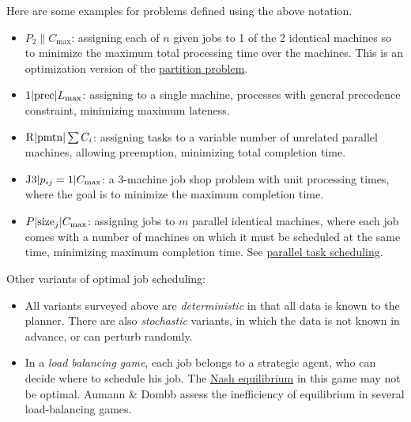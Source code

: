 \documentclass{article}
\begin{document}
Here are some examples for problems defined using the above notation.
\begin{itemize}
	\item $P_2\parallel C_{\max}$: assigning each of $n$ given jobs to 1 of the 2 identical machines so to minimize the maximum total processing time over the machines. This is an optimization version of the \href{https://en.wikipedia.org/wiki/Partition_problem}{partition problem}.
	\item $1|{\rm prec}|L_{\max}$: assigning to a single machine, processes with general precedence constraint, minimizing maximum lateness.
	\item ${\rm R}|{\rm pmtn}|\sum C_i$: assigning tasks to a variable number of unrelated parallel machines, allowing preemption, minimizing total completion time.
	\item ${\rm J}3|p_{ij} = 1|C_{\max}$: a 3-machine job shop problem with unit processing times, where the goal is to minimize the maximum completion time.
	\item $P|{\rm size}_j|C_{\max}$: assigning jobs to $m$ parallel identical machines, where each job comes with a number of machines on which it must be scheduled at the same time, minimizing maximum completion time. See \href{https://en.wikipedia.org/wiki/Parallel_task_scheduling}{parallel task scheduling}.
\end{itemize}
Other variants of optimal job scheduling:
\begin{itemize}
	\item All variants surveyed above are {\it deterministic} in that all data is known to the planner. There are also {\it stochastic} variants, in which the data is not known in advance, or can perturb randomly.
	\item In a {\it load balancing game}, each job belongs to a strategic agent, who can decide where to schedule his job. The \href{https://en.wikipedia.org/wiki/Nash_equilibrium}{Nash equilibrium} in this game may not be optimal. {\sc Aumann \& Dombb} assess the inefficiency of equilibrium in several load-balancing games.
\end{itemize}

\end{document}

